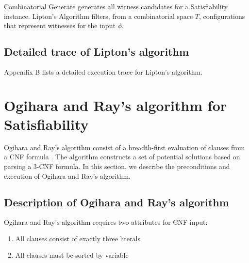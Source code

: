 
{\sc Combinatorial Generate} generates all witness candidates for a {\sc Satisfiability} instance.  {\sc Lipton's Algorithm} filters, from a combinatorial space $T$, configurations that represent witnesses for the input $\phi$.


	
\FloatBarrier



	
	\subsection{Detailed trace of Lipton's algorithm}
	
Appendix B lists a detailed execution trace for Lipton's algorithm.
	



\section{Ogihara and Ray's algorithm for {\sc Satisfiability}}


Ogihara and Ray's algorithm consist of a breadth-first evaluation of clauses from a CNF formula \cite{Ogihara:1996:BFS:898228,Ogihara97dna-basedparallel}.  The algorithm constructs a set of potential solutions based on parsing a 3-CNF formula.  In this section, we describe the preconditions and execution of Ogihara and Ray's algorithm.

\subsection{Description of Ogihara and Ray's algorithm}
		
Ogihara and Ray's algorithm requires two attributes for CNF input:

\begin{enumerate}
\item All clauses consist of exactly three literals
\item All clauses must be sorted by variable
\end{enumerate}

